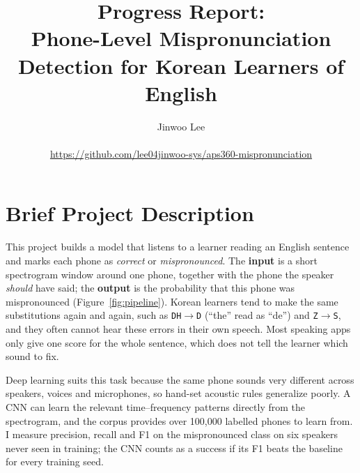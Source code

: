 \documentclass[final]{article}
\title{Progress Report:\\ Phone-Level Mispronunciation Detection for Korean Learners of English}
\author{%
  Jinwoo Lee \\
  \studentinfo\\
  \url{https://github.com/lee04jinwoo-sys/aps360-mispronunciation}\\
}
\begin{document}
\maketitle

\vspace{-0.5in}



\section*{Brief Project Description}
This project builds a model that listens to a learner reading an English sentence and marks each phone as
\emph{correct} or \emph{mispronounced}. The \textbf{input} is a short spectrogram window around one phone, together
with the phone the speaker \emph{should} have said; the \textbf{output} is the probability that this phone was
mispronounced (Figure~\ref{fig:pipeline}). Korean learners tend to make the same substitutions again and again, such
as \texttt{DH}$\rightarrow$\texttt{D} (``the'' read as ``de'') and \texttt{Z}$\rightarrow$\texttt{S}, and they often
cannot hear these errors in their own speech. Most speaking apps only give one score for the whole sentence, which
does not tell the learner which sound to fix.

Deep learning suits this task because the same phone sounds very different across speakers, voices and
microphones, so hand-set acoustic rules generalize poorly. A CNN can learn the relevant time--frequency patterns
directly from the spectrogram, and the corpus provides over 100,000 labelled phones to learn from. I measure
precision, recall and F1 on the mispronounced class on six speakers never seen in training; the CNN counts as a
success if its F1 beats the baseline for every training seed.
\end{document}
